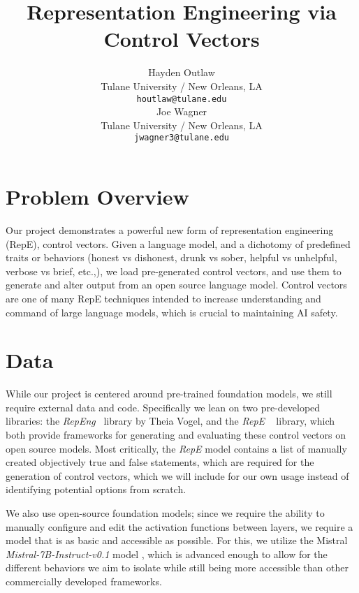 \documentclass[11pt,a4paper]{article}
\title{Representation Engineering via Control Vectors}
\author{Hayden Outlaw \\
  Tulane University / New Orleans, LA \\
  \texttt{houtlaw@tulane.edu} \\\And
  Joe Wagner \\
  Tulane University / New Orleans, LA \\
  \texttt{jwagner3@tulane.edu} \\}
\date{}
\begin{document}
\maketitle



\section{Problem Overview}

Our project demonstrates a powerful new form of representation engineering (RepE), control vectors. Given a language model, and a dichotomy of predefined traits or behaviors (honest vs dishonest, drunk vs sober, helpful vs unhelpful, verbose vs brief, etc.,), we load pre-generated control vectors, and use them to generate and alter output from an open source language model. Control vectors are one of many RepE techniques intended to increase understanding and command of large language models, which is crucial to maintaining AI safety.


\section{Data}
While our project is centered around pre-trained foundation models, we still require external data and code. Specifically we lean on two pre-developed libraries: the \emph{RepEng}~\cite{vogel2024repeng} library by Theia Vogel, and the \emph{RepE} ~\cite{zou2023representation} library, which both provide frameworks for generating and evaluating these control vectors on open source models. Most critically, the \emph{RepE} model contains a list of manually created objectively true and false statements, which are required for the generation of control vectors, which we will include for our own usage instead of identifying potential options from scratch.

We also use open-source foundation models; since we require the ability to manually configure and edit the activation functions between layers, we require a model that is as basic and accessible as possible. For this, we utilize the Mistral \emph{Mistral-7B-Instruct-v0.1} model \cite{jiang2023mistral}, which is advanced enough to allow for the different behaviors we aim to isolate while still being more accessible than other commercially developed frameworks.
\end{document}
